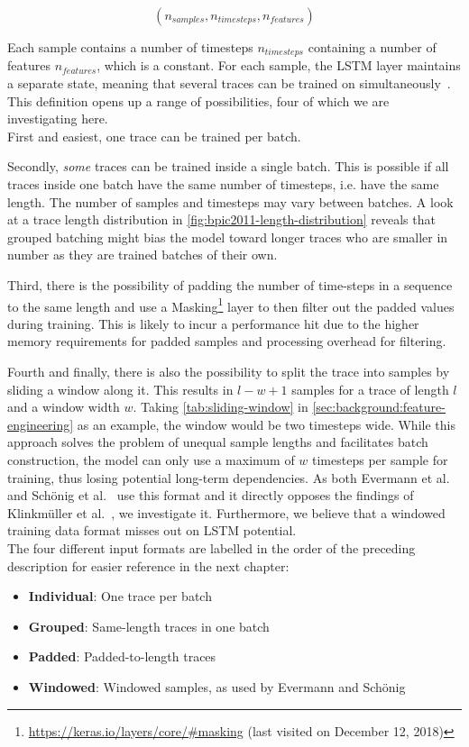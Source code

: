 $$(n_{samples}, n_{timesteps}, n_{features})$$

Each sample contains a number of timesteps $n_{timesteps}$ containing a number of features $n_{features}$, which is a constant. For each sample, the LSTM layer maintains a separate state, meaning that several traces can be trained on simultaneously~\cite{web:keras-lstm-state}. This definition opens up a range of possibilities, four of which we are investigating here.\\

First and easiest, one trace can be trained per batch.

Secondly, \textit{some} traces can be trained inside a single batch. This is possible if all traces inside one batch have the same number of timesteps, i.e. have the same length. The number of samples and timesteps may vary between batches. A look at a trace length distribution in \autoref{fig:bpic2011-length-distribution} reveals that grouped batching might bias the model toward longer traces who are smaller in number as they are trained batches of their own.

Third, there is the possibility of padding the number of time-steps in a sequence to the same length and use a Masking\footnote{\url{https://keras.io/layers/core/\#masking} (last visited on December 12, 2018)} layer to then filter out the padded values during training. This is likely to incur a performance hit due to the higher memory requirements for padded samples and processing overhead for filtering.

Fourth and finally, there is also the possibility to split the trace into samples by sliding a window along it. This results in $l-w+1$ samples for a trace of length $l$ and a window width $w$. Taking \autoref{tab:sliding-window} in \autoref{sec:background:feature-engineering} as an example, the window would be two timesteps wide. While this approach solves the problem of unequal sample lengths and facilitates batch construction, the model can only use a maximum of $w$ timesteps per sample for training, thus losing potential long-term dependencies. As both Evermann et al.~\cite{evermann2016} and Schönig et al.~\cite{schoenig2018} use this format and it directly opposes the findings of Klinkmüller et al.~\cite{klinkmuller2018reliablemonitoring}, we investigate it. Furthermore, we believe that a windowed training data format misses out on LSTM potential.\\

The four different input formats are labelled in the order of the preceding description for easier reference in the next chapter:
\begin{itemize}
    \item\textbf{Individual}: One trace per batch
    \item\textbf{Grouped}: Same-length traces in one batch
    \item\textbf{Padded}: Padded-to-length traces
    \item\textbf{Windowed}: Windowed samples, as used by Evermann and Schönig
\end{itemize}


